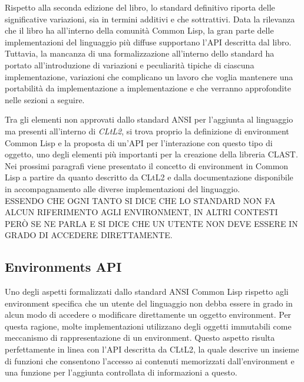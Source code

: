 Rispetto alla seconda edizione del libro, lo standard definitivo riporta delle
significative variazioni, sia in termini additivi e che sottrattivi. Data la
rilevanza che il libro ha all’interno della comunità Common Lisp, la gran parte
delle implementazioni del linguaggio più diffuse supportano l’API descritta dal
libro. Tuttavia, la mancanza di una formalizzazione all’interno dello standard
ha portato all’introduzione di variazioni e peculiarità tipiche di ciascuna
implementazione, variazioni che complicano un lavoro che voglia mantenere una
portabilità da implementazione a implementazione e che verranno approfondite
nelle sezioni a seguire.

Tra gli elementi non approvati dallo standard ANSI per l’aggiunta al linguaggio
ma presenti all’interno di \textit{CLtL2}, si trova proprio la definizione di
environment Common Lisp e la proposta di un'API per l’interazione con questo
tipo di oggetto, uno degli elementi più importanti per la creazione della
libreria CLAST. Nei prossimi paragrafi viene presentato il concetto di
environment in Common Lisp a partire da quanto descritto da CLtL2 e dalla
documentazione disponibile in accompagnamento alle diverse implementazioni del
linguaggio.\\

ESSENDO CHE OGNI TANTO SI DICE CHE LO STANDARD NON FA ALCUN RIFERIMENTO AGLI
ENVIRONMENT, IN ALTRI CONTESTI PERÒ SE NE PARLA E SI DICE CHE UN UTENTE NON
DEVE ESSERE IN GRADO DI ACCEDERE DIRETTAMENTE.

\subsection{Environments API}

Uno degli aspetti formalizzati dallo standard ANSI Common Lisp rispetto agli
environment specifica che un utente del linguaggio non debba essere in grado in
alcun modo di accedere o modificare direttamente un oggetto environment. Per
questa ragione, molte implementazioni utilizzano degli oggetti immutabili come
meccanismo di rappresentazione di un environment. Questo aspetto risulta
perfettamente in linea con l’API descritta da CLtL2, la quale descrive un
insieme di funzioni che consentono l’accesso ai contenuti memorizzati
dall’environment e una funzione per l’aggiunta controllata di informazioni a
questo.

